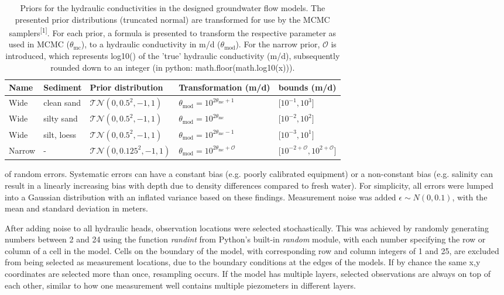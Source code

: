 \begin{table}[htb]
\caption{Priors for the hydraulic conductivities in the designed groundwater flow models. The presented prior distributions (truncated normal) are transformed for use by the MCMC samplers\textsuperscript{[1]}. For each prior, a formula is presented to transform the respective parameter as used in MCMC ($\theta_{\text{mc}}$), to a hydraulic conductivity in m/d ($\theta_{\text{mod}}$). For the narrow prior, $\mathcal{O}$ is introduced, which represents log10() of the 'true' hydraulic conductivity (m/d), subsequently rounded down to an integer (in python: math.floor(math.log10(x))).}
\label{tab_priors}
\setlength{\tabcolsep}{13pt} %
\begin{tabularx}{\textwidth}{lllll}
\toprule
Name & Sediment & Prior distribution & Transformation (m/d) & bounds (m/d) \\
\midrule
Wide & clean sand & $\mathcal{TN}(0, 0.5^2, -1, 1)$ & $\theta_{\text{mod}} = 10^{2\theta_{\text{mc}} + 1}$ & [$10^{-1},10^3]$\\
Wide & silty sand  & $\mathcal{TN}(0, 0.5^2, -1, 1)$ & $\theta_{\text{mod}} = 10^{2\theta_{\text{mc}}}$ &  [$10^{-2},10^2]$\\
Wide & silt, loess   & $\mathcal{TN}(0, 0.5^2, -1, 1)$  & $\theta_{\text{mod}} = 10^{2\theta_{\text{mc}} - 1}$  & [$10^{-3},10^1]$\\
\midrule
Narrow & - & $\mathcal{TN}(0, 0.125^2, -1, 1)$  &  $\theta_{\text{mod}} = 10^{2\theta_{\text{mc}} + \mathcal{O}}$ & [$10^{-2+\mathcal{O}},10^{2+\mathcal{O}}]$\\
\bottomrule
\end{tabularx}
\end{table}

\noindent of random errors. Systematic errors can have a constant bias (e.g. poorly calibrated equipment) or a non-constant bias (e.g. salinity can result in a linearly increasing bias with depth due to density differences compared to fresh water). %
For simplicity, all errors were lumped into a Gaussian distribution with an inflated variance based on these findings. Measurement noise was added $\epsilon \sim N(0,0.1)$, with the mean and standard deviation in meters.

After adding noise to all hydraulic heads, observation locations were selected stochastically. This was achieved by randomly generating numbers between 2 and 24 using the function \textit{randint} from Python's built-in \textit{random} module, with each number specifying the row or column of a cell in the model. Cells on the boundary of the model, with corresponding row and column integers of 1 and 25, are excluded from being selected as measurement locations, due to the boundary conditions at the edges of the models. If by chance the same x,y coordinates are selected more than once, resampling occurs. If the model has multiple layers, selected observations are always on top of each other, similar to how one measurement well contains multiple piezometers in different layers. 

